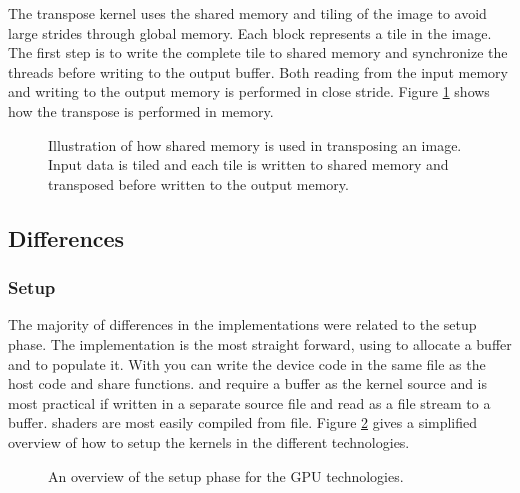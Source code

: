 The transpose kernel uses the shared memory and tiling of the image to avoid large strides through global memory. Each block represents a tile in the image. The first step is to write the complete tile to shared memory and synchronize the threads before writing to the output buffer. Both reading from the input memory and writing to the output memory is performed in close stride. Figure \ref{fig:transpose-memory} shows how the transpose is performed in memory.

\begin{figure}
	\centering
	
	\caption{Illustration of how shared memory is used in transposing an image. Input data is tiled and each tile is written to shared memory and transposed before written to the output memory. }
	\label{fig:transpose-memory}
\end{figure}

\subsection{Differences}%
\subsubsection{Setup}%
The majority of differences in the implementations were related to the setup phase. The {\CU} implementation is the most straight forward, using  to allocate a buffer and  to populate it. With {\CU} you can write the device code in the same file as the host code and share functions. {\OCL} and {\GL} require a  buffer as the kernel source and is most practical if written in a separate source file and read as a file stream to a  buffer. {\DX} shaders are most easily compiled from file. Figure \ref{fig:code:setup} gives a simplified overview of how to setup the kernels in the different technologies.%
\begin{figure}%
	\centering%
	\def \setupWidth {\textwidth / 2 - 18pt}%
	\hfill%
	\vfill%
	\hfill%
	\caption{An overview of the setup phase for the GPU technologies.}%
	\label{fig:code:setup}%
\end{figure}%

